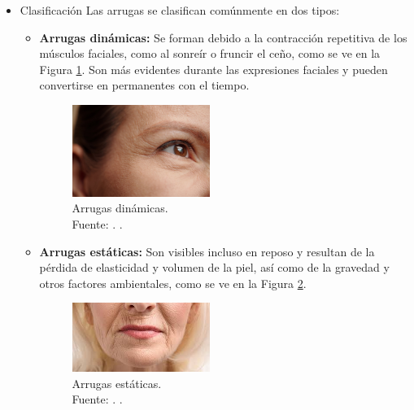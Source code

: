 \begin{itemize}
	\item Clasificación
Las arrugas se clasifican comúnmente en dos tipos:
\begin{itemize}
\item \textbf{Arrugas dinámicas:} Se forman debido a la contracción repetitiva de los músculos faciales, como al sonreír o fruncir el ceño, como se ve en la Figura \ref{2:ardin}. Son más evidentes durante las expresiones faciales y pueden convertirse en permanentes con el tiempo. \parencite{yoon2023}

\begin{figure}[H]
		\begin{center}
			\includegraphics[width=0.45\textwidth]{2/figures/arrugas dinamicas.jpg}
			\caption[Arrugas dinámicas]{Arrugas dinámicas.\\
			Fuente: \cite{medicinaesteticaregenerativa}. .}
			\label{2:ardin}
		\end{center}
	\end{figure}

\item \textbf{Arrugas estáticas:} Son visibles incluso en reposo y resultan de la pérdida de elasticidad y volumen de la piel, así como de la gravedad y otros factores ambientales, como se ve en la Figura \ref{2:arest}. \parencite{yoon2023}

\begin{figure}[H]
		\begin{center}
			\includegraphics[width=0.45\textwidth]{2/figures/arrugas estaticas.jpeg}
			\caption[Arrugas estáticas]{Arrugas estáticas.\\
			Fuente: \cite{dermatologiavelazquez}. .}
			\label{2:arest}
		\end{center}
	\end{figure}



\end{itemize}
\end{itemize}
